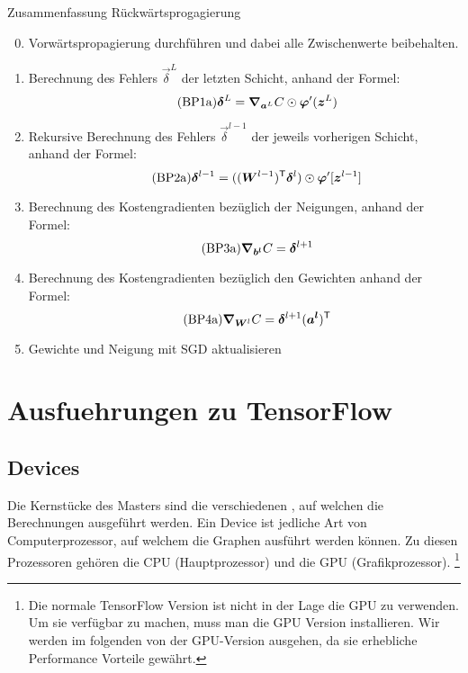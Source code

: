 \begin{appendices}
\begin{graybox}{Zusammenfassung Rückwärtsprogagierung}
  \begin{enumerate}
    \setcounter{enumi}{-1}
  \item{Vorwärtspropagierung durchführen und dabei alle Zwischenwerte beibehalten.}
    \item{Berechnung des Fehlers $\vec{\delta}^L$ der letzten Schicht, anhand
        der Formel:
      \begin{equation}\tag{BP1a}
        \bm{\delta}^L = \bm{\nabla}_{\bm{a}^L}C \odot \bm{\varphi}'(\bm{z}^L)
      \end{equation}
      }
      \item{Rekursive Berechnung des Fehlers $\vec{\delta}^{l-1}$ der jeweils
          vorherigen Schicht, anhand der Formel:
          \begin{equation}\tag{BP2a}
            \bm{\delta}^{l-1} = ((\bm{W}^{l-1})^{\mathsf{T}} \bm{\delta}^l) \odot \bm{\varphi}'[\bm{z}^{l-1}]
          \end{equation}
        }
      \item{Berechnung des Kostengradienten bezüglich der Neigungen, anhand der Formel:
          \begin{equation}\tag{BP3a}
            \bm{\nabla}_{\bm{b^l}} C =  \bm{\delta}^{l+1}
          \end{equation}
        }
      \item{Berechnung des Kostengradienten bezüglich den Gewichten anhand der Formel:
          \begin{equation}\tag{BP4a}
            \bm{\nabla}_{\bm{W}^l} C = \bm{\delta}^{l+1} (\bm{a^l})^{\mathsf{T}}
          \end{equation}
        }
      \item{Gewichte und Neigung mit SGD aktualisieren}
  \end{enumerate}
\end{graybox}

\para{}
\cite{Nielsen}
\cite{rojas}

\chapter{Ausfuehrungen zu TensorFlow}\label{sec:anhang_tf}
\section*{Devices}
Die Kernstücke des Masters sind die verschiedenen , auf
welchen die Berechnungen ausgeführt werden. Ein Device ist jedliche Art von
Computerprozessor, auf welchem die Graphen ausführt werden können.
Zu diesen Prozessoren gehören die CPU (Hauptprozessor) und die GPU (Grafikprozessor).
\footnote{
  Die normale TensorFlow Version ist nicht in der Lage die GPU zu verwenden. Um
  sie verfügbar zu machen, muss man die GPU Version installieren. Wir werden im folgenden
  von der GPU-Version ausgehen, da sie erhebliche Performance Vorteile gewährt.
}
\para{}


\end{appendices}
